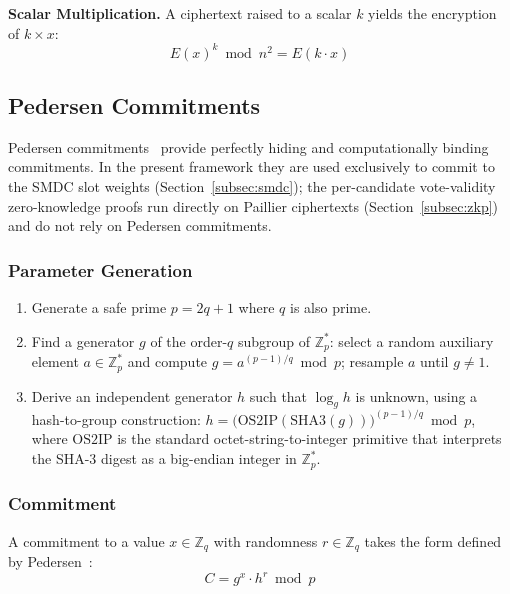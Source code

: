 \textbf{Scalar Multiplication.} A ciphertext raised to a scalar $k$ yields the encryption of $k \times x$:
\begin{equation}
    E(x)^k \bmod n^2 = E(k \cdot x)
    \label{eq:homo-scalar}
\end{equation}

\subsection{Pedersen Commitments}
\label{subsec:pedersen}

Pedersen commitments~\cite{pedersen1991} provide perfectly hiding and computationally binding commitments. In the present framework they are used exclusively to commit to the SMDC slot weights (Section~\ref{subsec:smdc}); the per-candidate vote-validity zero-knowledge proofs run directly on Paillier ciphertexts (Section~\ref{subsec:zkp}) and do not rely on Pedersen commitments.

\subsubsection{Parameter Generation}
\label{subsubsec:pedersen-params}

\begin{enumerate}
    \item Generate a safe prime $p = 2q + 1$ where $q$ is also prime.
    \item Find a generator $g$ of the order-$q$ subgroup of $\mathbb{Z}_p^*$: select a random auxiliary element $a \in \mathbb{Z}_p^*$ and compute $g = a^{(p-1)/q} \bmod p$; resample $a$ until $g \neq 1$.
    \item Derive an independent generator $h$ such that $\log_g h$ is unknown, using a hash-to-group construction: $h = \big(\text{OS2IP}(\text{SHA3}(g))\big)^{(p-1)/q} \bmod p$, where $\text{OS2IP}$ is the standard octet-string-to-integer primitive that interprets the SHA-3 digest as a big-endian integer in $\mathbb{Z}_p^*$.
\end{enumerate}

\subsubsection{Commitment}
\label{subsubsec:pedersen-commit}

A commitment to a value $x \in \mathbb{Z}_q$ with randomness $r \in \mathbb{Z}_q$ takes the form defined by Pedersen~\cite{pedersen1991}:
\begin{equation}
    C = g^x \cdot h^r \bmod p
    \label{eq:pedersen}
\end{equation}

